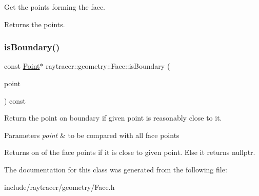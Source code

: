 Get the points forming the face. 

\begin{DoxyReturn}{Returns}
the points. 
\end{DoxyReturn}
\mbox{\label{classraytracer_1_1geometry_1_1Face_a4a71242ce34147b4260d9e62e9a1852c}} 
\subsubsection{\texorpdfstring{is\+Boundary()}{isBoundary()}}
{\footnotesize\ttfamily const \hyperlink{classraytracer_1_1geometry_1_1Point}{Point}$\ast$ raytracer\+::geometry\+::\+Face\+::is\+Boundary (\begin{DoxyParamCaption}\item[{const \hyperlink{classraytracer_1_1geometry_1_1Point}{Point} \&}]{point }\end{DoxyParamCaption}) const}



Return the point on boundary if given point is reasonably close to it. 


\begin{DoxyParams}{Parameters}
{\em point} & to be compared with all face points \\
\hline
\end{DoxyParams}
\begin{DoxyReturn}{Returns}
on of the face points if it is close to given point. Else it returns nullptr. 
\end{DoxyReturn}


The documentation for this class was generated from the following file\+:\begin{DoxyCompactItemize}
\item 
include/raytracer/geometry/Face.\+h\end{DoxyCompactItemize}

